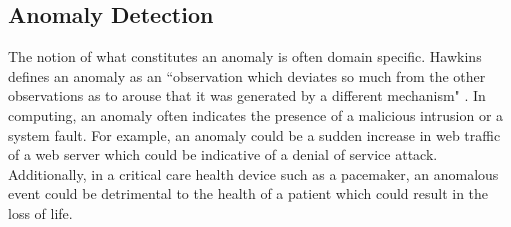  
%
%
%
%
%
%


\subsection{Anomaly Detection}

The notion of what constitutes an anomaly is often domain specific. Hawkins defines an anomaly as an ``observation which deviates so much from the other observations as to arouse that it was generated by a different mechanism" \cite{hawkins}. In computing, an anomaly often indicates the presence of a malicious intrusion or a system fault. For example, an anomaly could be a sudden increase in web traffic of a web server which could be indicative of a denial of service attack. Additionally, in a critical care health device such as a pacemaker, an anomalous event could be detrimental to the health of a patient which could result in the loss of life. 

